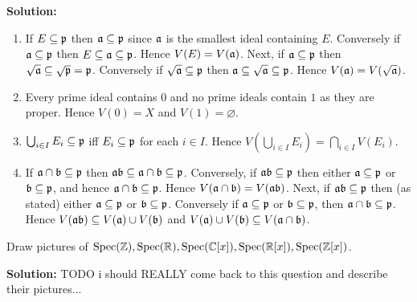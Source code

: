 \documentclass{article}
\begin{document}
\noindent\textbf{Solution:}
\begin{enumerate}
    \item
        If \(E \subseteq \mathfrak{p}\) then \(\mathfrak{a} \subseteq \mathfrak{p}\) since \(\mathfrak{a}\) is the smallest ideal containing \(E\).
        Conversely if \(\mathfrak{a} \subseteq \mathfrak{p}\) then \(E \subseteq \mathfrak{a} \subseteq \mathfrak{p}\).
        Hence \(V(E) = V(\mathfrak{a})\).
        Next, if \(\mathfrak{a} \subseteq \mathfrak{p}\) then \(\sqrt{\mathfrak{a}} \subseteq \sqrt{\mathfrak{p}} = \mathfrak{p}\).
        Conversely if \(\sqrt{\mathfrak{a}} \subseteq \mathfrak{p}\) then \(\mathfrak{a} \subseteq \sqrt{\mathfrak{a}} \subseteq \mathfrak{p}\).
        Hence \(V(\mathfrak{a}) = V(\sqrt{\mathfrak{a}})\).
    \item
        Every prime ideal contains \(0\) and no prime ideals contain \(1\) as they are proper.
        Hence \(V(0) = X\) and \(V(1) = \varnothing\).
    \item
        \(\bigcup_{i \in I} E_i \subseteq \mathfrak{p}\) iff \(E_i \subseteq \mathfrak{p}\) for each \(i \in I\).
        Hence \(V(\bigcup_{i \in I} E_i) = \bigcap_{i \in I} V(E_i)\).
    \item
        If \(\mathfrak{a} \cap \mathfrak{b} \subseteq \mathfrak{p}\) then \(\mathfrak{a} \mathfrak{b} \subseteq \mathfrak{a} \cap \mathfrak{b} \subseteq \mathfrak{p}\).
        Conversely, if \(\mathfrak{a} \mathfrak{b} \subseteq \mathfrak{p}\) then either \(\mathfrak{a} \subseteq \mathfrak{p}\) or \(\mathfrak{b} \subseteq \mathfrak{p}\), and hence \(\mathfrak{a} \cap \mathfrak{b} \subseteq \mathfrak{p}\).
        Hence \(V(\mathfrak{a} \cap \mathfrak{b}) = V(\mathfrak{a} \mathfrak{b})\).
        Next, if \(\mathfrak{a}\mathfrak{b} \subseteq \mathfrak{p}\) then (as stated) either \(\mathfrak{a} \subseteq \mathfrak{p}\) or \(\mathfrak{b} \subseteq \mathfrak{p}\).
        Conversely if \(\mathfrak{a} \subseteq \mathfrak{p}\) or \(\mathfrak{b} \subseteq \mathfrak{p}\), then \(\mathfrak{a} \cap \mathfrak{b} \subseteq \mathfrak{p}\).
        Hence \(V(\mathfrak{a} \mathfrak{b}) \subseteq V(\mathfrak{a}) \cup V(\mathfrak{b})\) and \(V(\mathfrak{a}) \cup V(\mathfrak{b}) \subseteq V(\mathfrak{a} \cap \mathfrak{b})\).
\end{enumerate}

\begin{exercise}
    Draw pictures of \(\operatorname{Spec}(\mathbb{Z}), \operatorname{Spec}(\mathbb{R}), \operatorname{Spec}(\mathbb{C}[x]), \operatorname{Spec}(\mathbb{R}[x]), \operatorname{Spec}(\mathbb{Z}[x])\).
\end{exercise}

\noindent\textbf{Solution:}
TODO i should REALLY come back to this question and describe their pictures...
\end{document}
